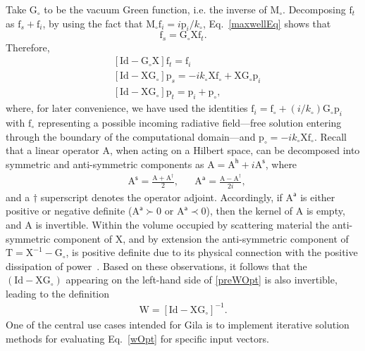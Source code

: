 \documentclass[reprint,aps,prb]{revtex4-2}
\newcommand{\bmm}[1]{\bm{\mathrm{#1}}}
\begin{document}
Take $\bmm{G}_{\circ}$ to be the vacuum Green function, i.e. the inverse of $\bmm{M}_{\circ}$.
Decomposing $\bmm{f}_{t}$ as $\bmm{f}_{s} + \bmm{f}_{i}$, by using the fact that $\bmm{M}_{\circ}\bmm{f}_{i} = i \bmm{p}_{i}/k_{\circ}$, Eq.~\eqref{maxwellEq} shows that
\begin{equation}
	\bmm{f}_{s} = \bmm{G}_{\circ}\bmm{X}\bmm{f}_{t}. 
\end{equation}
Therefore,
\begin{align}
	&\left[\bmm{Id}-\bmm{G}_{\circ}\bmm{X}\right]\bmm{f}_{t} = \bmm{f}_{i} 
	\nonumber \\
	&\left[\bmm{Id}-\bmm{X}\bmm{G}_{\circ}\right]\bmm{p}_{s} = -ik_{\circ}\bmm{X}\bmm{f}_{\circ} + \bmm{X}\bmm{G}_{\circ}\bmm{p}_{i} \nonumber \\
	&\left[\bmm{Id}-\bmm{X}\bmm{G}_{\circ}\right]\bmm{p}_{t} = \bmm{p}_{i} +\bmm{p}_{\circ}
	\label{preWOpt},
\end{align}
where, for later convenience, we have used the identities $\bmm{f}_{i} = \bmm{f}_{\circ} + \left(i/k_{\circ}\right)\bmm{G}_{\circ}\bmm{p}_{i}$ with $\bmm{f}_{\circ}$ representing a possible incoming radiative field---free solution entering through the boundary of the computational domain---and $\bmm{p}_{\circ} = -i k_{\circ}\bmm{X}\bmm{f}_{\circ}$. 
Recall that a linear operator $\bmm{A}$, when acting on a Hilbert space, can be decomposed into symmetric and anti-symmetric components as $\bmm{A} = \bmm{A}^{\mathsf{h}} + i \bmm{A}^{\mathsf{s}}$, where 
\begin{align}
	&\bmm{A}^{\mathsf{s}} = \frac{\bmm{A} + \bmm{A}^{\dagger}}{2}, & &\bmm{A}^{\mathsf{a}} = \frac{\bmm{A}-\bmm{A}^{\dagger}}{2i},
	\label{symAsym}
\end{align}
and a $\dagger$ superscript denotes the operator adjoint. 
Accordingly, if $\bmm{A}^{\mathsf{a}}$ is either positive or negative definite ($\bmm{A}^{\mathsf{a}}\succ 0$ or $\bmm{A}^{\mathsf{a}} \prec 0$), then the kernel of $\bmm{A}$ is empty, and $\bmm{A}$ is invertible. 
Within the volume occupied by scattering material the anti-symmetric component of $\bmm{X}$, and by extension the anti-symmetric component of $\bmm{T} = \bmm{X}^{-1} - \bmm{G}_{\circ}$, is positive definite due to its physical connection with the positive dissipation of power~\cite{landau2013statistical}. 
Based on these observations, it follows that the $\left(\bmm{Id}-\bmm{X}\bmm{G}_{\circ}\right)$ appearing on the left-hand side of \eqref{preWOpt} is also invertible, leading to the definition 
\begin{align}
	\bmm{W} = \left[\bmm{Id} - \bmm{X}\bmm{G}_{\circ}\right]^{-1}.
	\label{wOpt}
\end{align}
One of the central use cases intended for Gila is to implement iterative solution methods for evaluating Eq.~\eqref{wOpt} for specific input vectors. 
\end{document}

